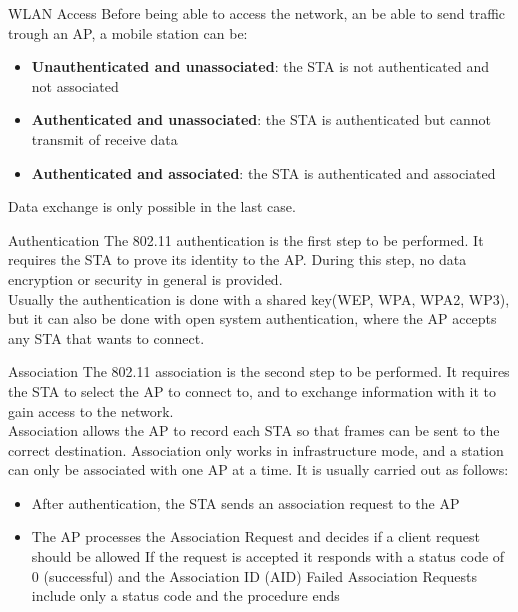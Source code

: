 \begin{section}{WLAN Access}
  Before being able to access the network, an be able to send traffic trough an AP, a 
  mobile station can be:
  \begin{itemize}
    \item \textbf{Unauthenticated and unassociated}: the STA is not authenticated and not associated
    \item \textbf{Authenticated and unassociated}: the STA is authenticated but cannot transmit of receive 
      data
    \item \textbf{Authenticated and associated}: the STA is authenticated and associated
  \end{itemize}
  Data exchange is only possible in the last case.
  \begin{paragraph}{Authentication}
    \label{par:authentication}
    The 802.11 authentication is the first step to be performed. It requires the STA to prove its identity
    to the AP. During this step, no data encryption or security in general is provided.\\
    Usually the authentication is done with a shared key(WEP, WPA, WPA2, WP3), but it can also be 
    done with open system authentication, where the AP accepts any STA that wants to connect.\\
  \end{paragraph}
  \begin{paragraph}{Association}
    The 802.11 association is the second step to be performed. It requires the STA to select the AP to connect to,
    and to exchange information with it to gain access to the network.\\
    Association allows the AP to record each STA so that frames can be sent to the correct destination.
    Association only works in infrastructure mode, and a station can only be associated with one AP at a time.
    It is usually carried out as follows:
    \begin{itemize}
      \item After authentication, the STA sends an association request to the AP
      \item The AP processes the Association Request and decides if a client request should be allowed
        \subitem If the request is accepted it responds with a status code of 0 (successful) and the 
        Association ID (AID)
        \subitem Failed Association Requests include only a status code and the procedure ends
    \end{itemize}
  \end{paragraph}

\end{section}
